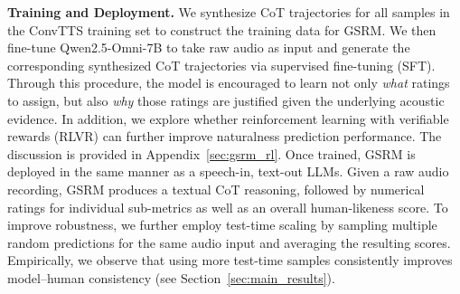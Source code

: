 \textbf{Training and Deployment.} We synthesize CoT trajectories for all samples in the ConvTTS training set to construct the training data for GSRM. We then fine-tune Qwen2.5-Omni-7B to take raw audio as input and generate the corresponding synthesized CoT trajectories via supervised fine-tuning (SFT). Through this procedure, the model is encouraged to learn not only \emph{what} ratings to assign, but also \emph{why} those ratings are justified given the underlying acoustic evidence. In addition, we explore whether reinforcement learning with verifiable rewards (RLVR) can further improve naturalness prediction performance. The discussion is provided in Appendix~\ref{sec:gsrm_rl}. Once trained, GSRM is deployed in the same manner as a speech-in, text-out LLMs. Given a raw audio recording, GSRM produces a textual CoT reasoning, followed by numerical ratings for individual sub-metrics as well as an overall human-likeness score. To improve robustness, we further employ test-time scaling by sampling multiple random predictions for the same audio input and averaging the resulting scores. Empirically, we observe that using more test-time samples consistently improves model–human consistency (see Section~\ref{sec:main_results}).

